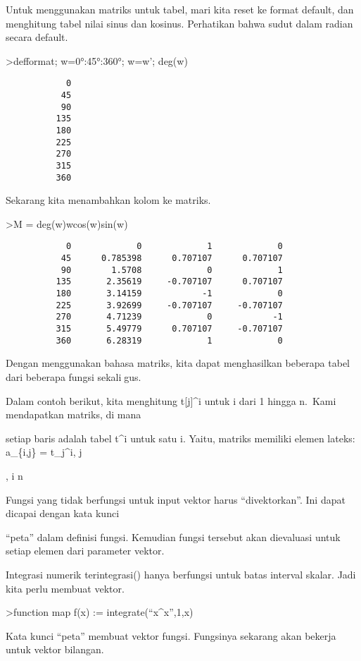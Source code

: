 \documentclass[
]{book}
\begin{document}
Untuk menggunakan matriks untuk tabel, mari kita reset ke format default, dan menghitung tabel nilai sinus dan kosinus. Perhatikan bahwa sudut dalam radian secara default.

\textgreater defformat; w=0°:45°:360°; w=w'; deg(w)

\begin{verbatim}
            0 
           45 
           90 
          135 
          180 
          225 
          270 
          315 
          360 
\end{verbatim}

Sekarang kita menambahkan kolom ke matriks.

\textgreater M = deg(w)\textbar w\textbar cos(w)\textbar sin(w)

\begin{verbatim}
            0             0             1             0 
           45      0.785398      0.707107      0.707107 
           90        1.5708             0             1 
          135       2.35619     -0.707107      0.707107 
          180       3.14159            -1             0 
          225       3.92699     -0.707107     -0.707107 
          270       4.71239             0            -1 
          315       5.49779      0.707107     -0.707107 
          360       6.28319             1             0 
\end{verbatim}

Dengan menggunakan bahasa matriks, kita dapat menghasilkan beberapa tabel dari beberapa fungsi sekaligus.

Dalam contoh berikut, kita menghitung t{[}j{]}\^{}i untuk i dari 1 hingga n.~Kami mendapatkan matriks, di mana

setiap baris adalah tabel t\^{}i untuk satu i. Yaitu, matriks memiliki elemen lateks: a\_\{i,j\} = t\_j\^{}i,  \le j

,  \le i \le n

Fungsi yang tidak berfungsi untuk input vektor harus ``divektorkan''. Ini dapat dicapai dengan kata kunci

``peta'' dalam definisi fungsi. Kemudian fungsi tersebut akan dievaluasi untuk setiap elemen dari parameter vektor.

Integrasi numerik terintegrasi() hanya berfungsi untuk batas interval skalar. Jadi kita perlu membuat vektor.

\textgreater function map f(x) := integrate(``x\^{}x'',1,x)

Kata kunci ``peta'' membuat vektor fungsi. Fungsinya sekarang akan bekerja untuk vektor bilangan.
\end{document}
